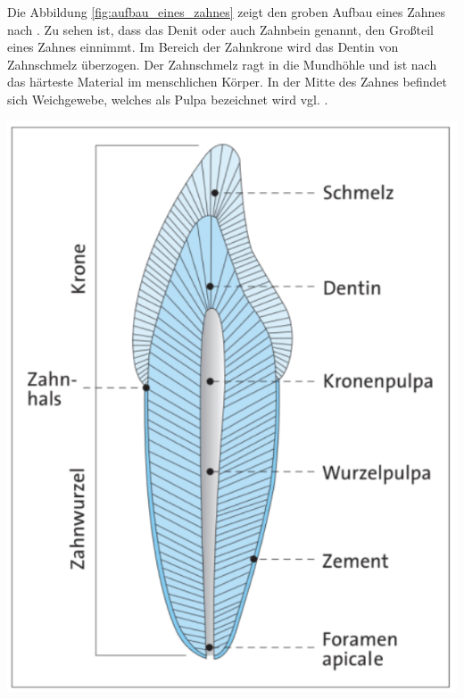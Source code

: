 \begin{minipage}{0.40\textwidth}
	Die Abbildung \ref{fig:aufbau_eines_zahnes} zeigt den groben Aufbau eines Zahnes
	nach \citet[Seite 17]{lehmann2012Zahnheilkunde}. Zu sehen ist, dass das Denit oder
	auch Zahnbein genannt, den Großteil eines Zahnes einnimmt. Im Bereich der Zahnkrone
	wird das Dentin von Zahnschmelz überzogen. Der Zahnschmelz ragt in die
	Mundhöhle und ist nach \cite[Seite 41]{lehmann2012Zahnheilkunde} das härteste
	Material im menschlichen Körper. In der Mitte des Zahnes befindet sich Weichgewebe,
	welches als Pulpa bezeichnet wird vgl. \citep[Seite ]{lehmann2012Zahnheilkunde}.
\end{minipage}
\hfill
\begin{minipage}{0.50\textwidth}
	\centering
	\includegraphics[scale=0.50]{img/aufbau_eines_zahns.jpg}
	 \label{fig:aufbau_eines_zahnes}
\end{minipage}

